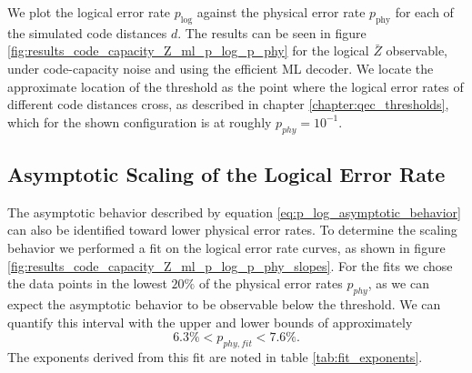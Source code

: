 We plot the logical error rate $p_{\mathrm{log}}$ against the physical error rate $p_{\mathrm{phy}}$ for each of the simulated code distances $d$.
The results can be seen in figure \ref{fig:results_code_capacity_Z_ml_p_log_p_phy} for the logical $\bar{Z}$ observable, under code-capacity noise and using the efficient ML decoder.
We locate the approximate location of the threshold as the point where the logical error rates of different code distances cross, as described in chapter \ref{chapter:qec_thresholds}, 
which for the shown configuration is at roughly $p_{phy}=10^{-1}$. 

\subsection{Asymptotic Scaling of the Logical Error Rate}
The asymptotic behavior described by equation \eqref{eq:p_log_asymptotic_behavior} can also be identified toward lower physical error rates.
To determine the scaling behavior we performed a fit on the logical error rate curves, as shown in figure \ref{fig:results_code_capacity_Z_ml_p_log_p_phy_slopes}.
For the fits we chose the data points in the lowest $20\%$ of the physical error rates $p_{phy}$, as we can expect the asymptotic behavior to be observable below the threshold. 
We can quantify this interval with the upper and lower bounds of approximately
\begin{equation}
   6.3\% < p_{phy,fit} < 7.6\%.
\end{equation}
The exponents derived from this fit are noted in table \ref{tab:fit_exponents}. 

